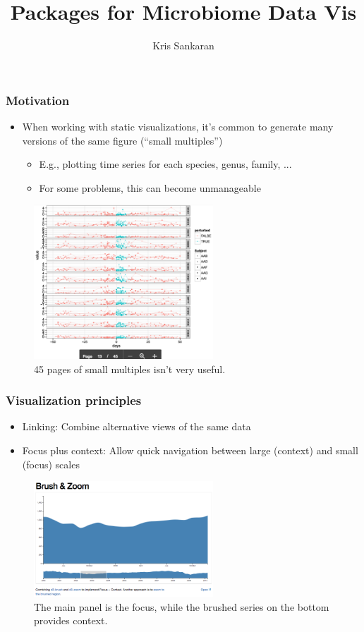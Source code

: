 \documentclass{beamer}
\title{Packages for Microbiome Data Vis}
\author{Kris Sankaran}
\begin{document}
\begin{frame}
  \frametitle{Motivation}

\begin{itemize}
\item When working with static visualizations, it's common to generate many
  versions of the same figure (``small multiples'')
  \begin{itemize}
  \item E.g., plotting time series for each species, genus, family, ...
  \item For some problems, this can become unmanageable
  \end{itemize}
\end{itemize}
\begin{figure}
  \centering
  \includegraphics[width=0.6\textwidth]{many_series.png}
  \caption{45 pages of small multiples isn't very useful. \label{fig:many_series} }
\end{figure}
\end{frame}

\begin{frame}
  \frametitle{Visualization principles}

  \begin{itemize}
  \item Linking: Combine alternative views of the same data
  \item Focus plus context: Allow quick navigation between large (context) and
    small (focus) scales
  \end{itemize}
\begin{figure}
  \centering
  \includegraphics[width=0.6\textwidth]{d3-focus-context}
  \caption{The main panel is the focus, while the brushed series on the bottom
    provides context.}
\end{figure}

\end{frame}
\end{document}
